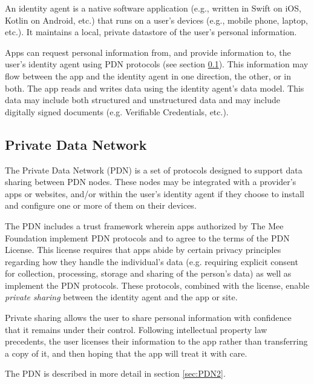 \documentclass[11pt, oneside]{article}   	%
\begin{document}
An identity agent is a native software application (e.g., written in Swift on iOS, Kotlin on Android, etc.) that runs on a user's devices (e.g., mobile phone, laptop, etc.). It maintains a local, private datastore of the user's personal information. 

Apps can request personal information from, and provide information to, the user's identity agent using PDN protocols (see section \ref{sec:PDN}). This information may flow between the app and the identity agent in one direction, the other, or in both. The app reads and writes data using the identity agent's data model. This data may include both structured and unstructured data and may include digitally signed documents (e.g. Verifiable Credentials, etc.). 

\subsection{Private Data Network}\label{sec:PDN}

The Private Data Network (PDN) is a set of protocols designed to support data sharing between PDN nodes. These nodes may be integrated with a provider's apps or websites, and/or within the user's identity agent if they choose to install and configure one or more of them on their devices.

The PDN includes a trust framework wherein apps authorized by The Mee Foundation implement PDN protocols and to agree to the terms of the PDN License. This license requires that apps abide by certain privacy principles regarding how they handle the individual's data (e.g. requiring explicit consent for collection, processing, storage and sharing of the person's data) as well as implement the PDN protocols. These protocols, combined with the license, enable \emph{private sharing} between the identity agent and the app or site. 

Private sharing allows the user to share personal information with confidence that it remains under their control. Following intellectual property law precedents, the user licenses their information to the app rather than transferring a copy of it, and then hoping that the app will treat it with care. 

The PDN is described in more detail in section \ref{sec:PDN2}.
\end{document}
